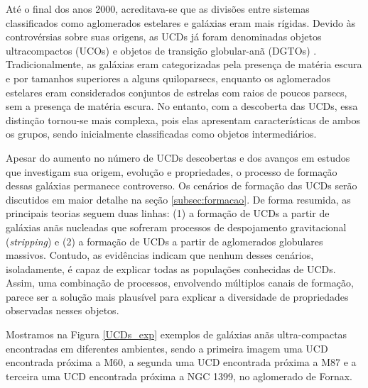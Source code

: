 Até o final dos anos 2000, acreditava-se que as divisões entre sistemas classificados como aglomerados estelares e galáxias eram mais rígidas. Devido às controvérsias sobre suas origens, as UCDs já foram denominadas objetos ultracompactos (UCOs) \citep{Mieske_2002} e objetos de transição globular-anã (DGTOs) \citep{Hasegan_2005}. Tradicionalmente, as galáxias eram categorizadas pela presença de matéria escura e por tamanhos superiores a alguns quiloparsecs, enquanto os aglomerados estelares eram considerados conjuntos de estrelas com raios de poucos parsecs, sem a presença de matéria escura. No entanto, com a descoberta das UCDs, essa distinção tornou-se mais complexa, pois elas apresentam características de ambos os grupos, sendo inicialmente classificadas como objetos intermediários.

Apesar do aumento no número de UCDs descobertas e dos avanços em estudos que investigam sua origem, evolução e propriedades, o processo de formação dessas galáxias permanece controverso. Os cenários de formação das UCDs serão discutidos em maior detalhe na seção \ref{subsec:formacao}. De forma resumida, as principais teorias seguem duas linhas: (1) a formação de UCDs a partir de galáxias anãs nucleadas que sofreram processos de despojamento gravitacional (\textit{stripping}) e (2) a formação de UCDs a partir de aglomerados globulares massivos. Contudo, as evidências indicam que nenhum desses cenários, isoladamente, é capaz de explicar todas as populações conhecidas de UCDs. Assim, uma combinação de processos, envolvendo múltiplos canais de formação, parece ser a solução mais plausível para explicar a diversidade de propriedades observadas nesses objetos.

Mostramos na Figura \ref{UCDs_exp} exemplos de galáxias anãs ultra-compactas encontradas em diferentes ambientes, sendo a primeira imagem uma UCD encontrada próxima a M60, a segunda uma UCD encontrada próxima a M87 e a terceira uma UCD encontrada próxima a NGC 1399, no aglomerado de Fornax.

